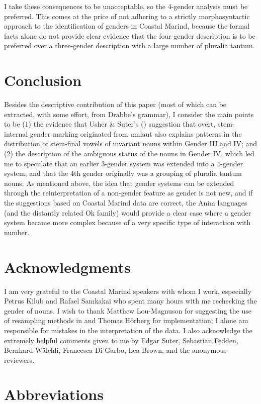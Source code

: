 \documentclass[output=collectionpaper]{langsci/langscibook}
\begin{document}
I take these consequences to be unacceptable, so the 4-gender analysis must be preferred. This comes at the price of not adhering to a strictly morphosyntactic approach to the identification of genders in Coastal Marind, because the formal facts alone do not provide clear evidence that the four-gender description is to be preferred over a three-gender description with a large number of pluralia tantum.

\section{Conclusion}

Besides the descriptive contribution of this paper (most of which can be extracted, with some effort, from Drabbe's grammar), I consider the main points to be (1) the evidence that Usher \& Suter's (\citeyear{Usher2015}) suggestion that overt, stem-internal gender marking originated from umlaut also explains patterns in the distribution of stem-final vowels of invariant nouns within Gender III and IV; and (2) the description of the ambiguous status of the nouns in Gender IV, which led me to speculate that an earlier 3-gender system was extended into a 4-gender system, and that the 4th gender originally was a grouping of pluralia tantum nouns. As mentioned above, the idea that gender systems can be extended through the reinterpretation of a non-gender feature as gender is not new, and if the suggestions based on Coastal Marind data are correct, the Anim languages (and the distantly related Ok family) would provide a clear case where a gender system became more complex because of a very specific type of interaction with number.

\section*{Acknowledgments}
I am very grateful to the Coastal Marind speakers with whom I work, especially Petrus Kilub and Rafael Samkakai who spent many hours with me rechecking the gender of nouns. I wish to thank Matthew Lou-Magnuson for suggesting the use of resampling methods in  and Thomas H\"orberg for implementation; I alone am responsible for mistakes in the interpretation of the data. I also acknowledge the extremely helpful comments given to me by Edgar Suter, Sebastian Fedden, Bernhard Wälchli, Francesca Di Garbo, Lea Brown, and the anonymous reviewers.

\section*{Abbreviations}
\end{document}
